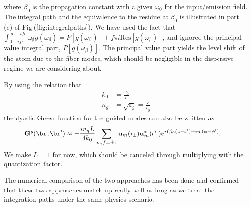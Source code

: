 \documentclass[]{report}
\begin{document}
where $ \beta_0 $ is the propagation constant with a given $ \omega_0 $ for the input/emission field. The integral path and the equivalence to the residue at $ \beta_0 $ is illustrated in part (c) of Fig.(\ref{fig:integralpaths}). We have used the fact that $ \int_{0-if\epsilon}^{\infty-if\epsilon} \mathrm{\omega_\beta}g(\omega_\beta) = P\left[ g(\omega_\beta)\right] +f\pi i \mathrm{Res}\left[g(\omega_\beta) \right] $, and ignored the principal value integral part, $ P\left[ g(\omega_\beta)\right] $. The principal value part yields the level shift of the atom due to the fiber modes, which should be negligible in the dispersive regime we are considering about.  

By using the relation that 
\begin{align}
k_0 &=\frac{\omega_0}{c}\\
n_g&=\sqrt{\varepsilon_g}= \frac{c}{v_g}
\end{align}
the dyadic Green function for the guided modes can also be written as
\begin{align}
\mathbf{G}^g(\br,\br') &\approx -\frac{in_gL}{4k_0} \sum_{m,f=\pm 1} \mathbf{u}_{m}(r\!_\perp)\mathbf{u}^*_{m}(r_{\!\perp}^\prime)e^{if\beta_0(z-z')+im(\phi-\phi')}.
\end{align}
We make $ L=1 $ for now, which should be canceled through multiplying with the quantization factor. 
 


The numerical comparison of the two approaches has been done and confirmed that these two approaches match up really well as long as we treat the integration paths under the same physics scenario.  
\end{document}

